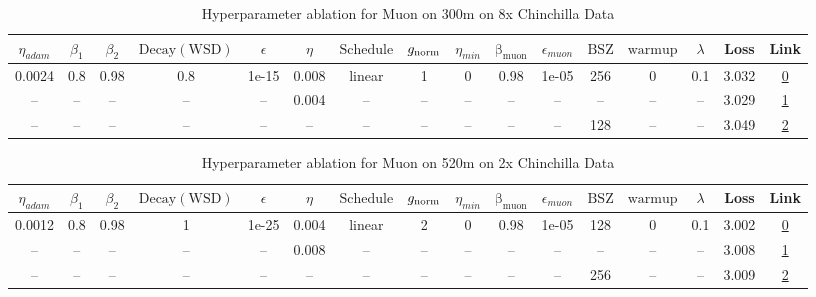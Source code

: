 \begin{table}[H]
\centering
\caption{Hyperparameter ablation for Muon on 300m on 8x Chinchilla Data}
\label{tab:ablation_muon_300m_on_8x_chinchilla_data}
\begin{tabular}{cccccccccccccccc}
\toprule
$\eta_{adam}$ & $\beta_1$ & $\beta_2$ & $\mathrm{Decay (WSD)}$ & $\epsilon$ & $\eta$ & $\mathrm{Schedule}$ & $g_{\mathrm{norm}}$ & $\eta_{min}$ & $\mathrm{\beta_{muon}}$ & $\epsilon_{muon}$ & $\mathrm{BSZ}$ & $\mathrm{warmup}$ & $\lambda$ & Loss & Link \\
\midrule
0.0024 & 0.8 & 0.98 & 0.8 & 1e-15 & 0.008 & linear & 1 & 0 & 0.98 & 1e-05 & 256 & 0 & 0.1 & 3.032 & \href{https://wandb.ai/marin-community/optimizer-scaling/runs/sweep-300m-48B-muond28b65lr0.008-wd0.1-minlr0-warmup0-b10.8-b20.-3e14c1}{0} \\
\midrule
-- & -- & -- & -- & -- & 0.004 & -- & -- & -- & -- & -- & -- & -- & -- & 3.029 & \href{https://wandb.ai/marin-community/optimizer-scaling/runs/sweep-300m-48B-muont25115alr0.004-wd0.1-minlr0-warmup0-b10.8-b20-983da2}{1} \\
-- & -- & -- & -- & -- & -- & -- & -- & -- & -- & -- & 128 & -- & -- & 3.049 & \href{https://wandb.ai/marin-community/optimizer-scaling/runs/sweep-300m-48B-muonta4ae77lr0.008-wd0.1-minlr0-warmup0-b10.8-b20-41c572}{2} \\
\bottomrule
\end{tabular}
\end{table}

\begin{table}[H]
\centering
\caption{Hyperparameter ablation for Muon on 520m on 2x Chinchilla Data}
\label{tab:ablation_muon_520m_on_2x_chinchilla_data}
\begin{tabular}{cccccccccccccccc}
\toprule
$\eta_{adam}$ & $\beta_1$ & $\beta_2$ & $\mathrm{Decay (WSD)}$ & $\epsilon$ & $\eta$ & $\mathrm{Schedule}$ & $g_{\mathrm{norm}}$ & $\eta_{min}$ & $\mathrm{\beta_{muon}}$ & $\epsilon_{muon}$ & $\mathrm{BSZ}$ & $\mathrm{warmup}$ & $\lambda$ & Loss & Link \\
\midrule
0.0012 & 0.8 & 0.98 & 1 & 1e-25 & 0.004 & linear & 2 & 0 & 0.98 & 1e-05 & 128 & 0 & 0.1 & 3.002 & \href{https://wandb.ai/marin-community/optimizer-scaling/runs/sweep-520m-21B-muon7ace6clr0.004-wd0.1-minlr0-warmup0-b10.8-b20.-748517}{0} \\
\midrule
-- & -- & -- & -- & -- & 0.008 & -- & -- & -- & -- & -- & -- & -- & -- & 3.008 & \href{https://wandb.ai/marin-community/optimizer-scaling/runs/sweep-520m-21B-muon92eab1lr0.008-wd0.1-minlr0-warmup0-b10.8-b20.-02816a}{1} \\
-- & -- & -- & -- & -- & -- & -- & -- & -- & -- & -- & 256 & -- & -- & 3.009 & \href{https://wandb.ai/marin-community/optimizer-scaling/runs/sweep-520m-21B-muonfcc2a8lr0.004-wd0.1-minlr0-warmup0-b10.8-b20.-f61e26}{2} \\
\bottomrule
\end{tabular}
\end{table}


